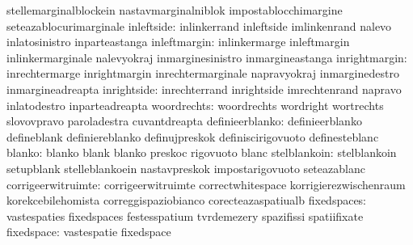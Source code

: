                                   stellemarginalblockein           nastavmarginalniblok
                                  impostablocchimargine            seteazablocurimarginale
                      inleftside: inlinkerrand                     inleftside
                                  imlinkenrand                     nalevo
                                  inlatosinistro                   inparteastanga
                    inleftmargin: inlinkermarge                    inleftmargin
                                  inlinkermarginale                nalevyokraj
                                  inmarginesinistro                inmargineastanga
                   inrightmargin: inrechtermarge                   inrightmargin
                                  inrechtermarginale               napravyokraj
                                  inmarginedestro                  inmargineadreapta
                     inrightside: inrechterrand                    inrightside
                                  imrechtenrand                    napravo
                                  inlatodestro                     inparteadreapta
                     woordrechts: woordrechts                      wordright
                                  wortrechts                       slovovpravo
                                  paroladestra                     cuvantdreapta
                 definieerblanko: definieerblanko                  defineblank
                                  definiereblanko                  definujpreskok
                                  definiscirigovuoto               definesteblanc
                          blanko: blanko                           blank
                                  blanko                           preskoc
                                  rigovuoto                        blanc
                    stelblankoin: stelblankoin                     setupblank
                                  stelleblankoein                  nastavpreskok
                                  impostarigovuoto                 seteazablanc
              corrigeerwitruimte: corrigeerwitruimte               correctwhitespace
                                  korrigierezwischenraum           korekcebilehomista
                                  correggispaziobianco             corecteazaspatiualb
                     fixedspaces: vastespaties                     fixedspaces
                                  festesspatium                    tvrdemezery
                                  spazifissi                       spatiifixate
                      fixedspace: vastespatie                      fixedspace
